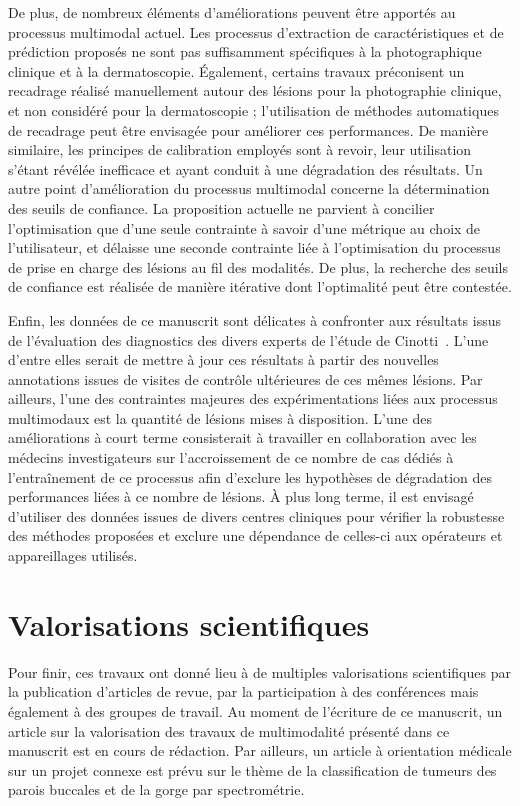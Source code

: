 De plus, de nombreux éléments d'améliorations peuvent être apportés au processus multimodal actuel. Les processus d'extraction de caractéristiques et de prédiction proposés ne sont pas suffisamment spécifiques à la photographique clinique et à la dermatoscopie. Également, certains travaux préconisent un recadrage réalisé manuellement autour des lésions pour la photographie clinique, et non considéré pour la dermatoscopie ; l'utilisation de méthodes automatiques de recadrage peut être envisagée pour améliorer ces performances. De manière similaire, les principes de calibration employés sont à revoir, leur utilisation s'étant révélée inefficace et ayant conduit à une dégradation des résultats. Un autre point d'amélioration du processus multimodal concerne la détermination des seuils de confiance. La proposition actuelle ne parvient à concilier l'optimisation que d'une seule contrainte à savoir d'une métrique au choix de l'utilisateur, et délaisse une seconde contrainte liée à l'optimisation du processus de prise en charge des lésions au fil des modalités. De plus, la recherche des seuils de confiance est réalisée de manière itérative dont l'optimalité peut être contestée.\par

Enfin, les données de ce manuscrit sont délicates à confronter aux résultats issus de l'évaluation des diagnostics des divers experts de l'étude de Cinotti~. L'une d'entre elles serait de mettre à jour ces résultats à partir des nouvelles annotations issues de visites de contrôle ultérieures de ces mêmes lésions. Par ailleurs, l'une des contraintes majeures des expérimentations liées aux processus multimodaux est la quantité de lésions mises à disposition. L'une des améliorations à court terme consisterait à travailler en collaboration avec les médecins investigateurs sur l'accroissement de ce nombre de cas dédiés à l'entraînement de ce processus afin d'exclure les hypothèses de dégradation des performances liées à ce nombre de lésions. À plus long terme, il est envisagé d'utiliser des données issues de divers centres cliniques pour vérifier la robustesse des méthodes proposées et exclure une dépendance de celles-ci aux opérateurs et appareillages utilisés.\par

\clearpage

\section*{Valorisations scientifiques}
Pour finir, ces travaux ont donné lieu à de multiples valorisations scientifiques par la publication d'articles de revue, par la participation à des conférences mais également à des groupes de travail. Au moment de l'écriture de ce manuscrit, un article sur la valorisation des travaux de multimodalité présenté dans ce manuscrit est en cours de rédaction. Par ailleurs, un article à orientation médicale sur un projet connexe est prévu sur le thème de la classification de tumeurs des parois buccales et de la gorge par spectrométrie.\par

